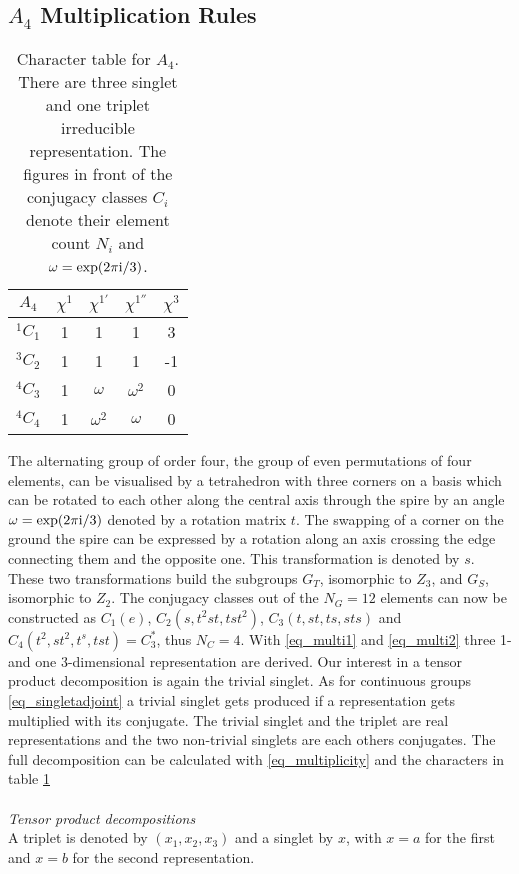 \begin{appendix}
\section{$A_4$ Multiplication Rules}
\label{sec_appendixA4}
\begin{table}[t]
 \begin{tabular}{c|cccc}
 $A_4$ & $\chi^1$ & $\chi^{1'}$ & $\chi^{1''}$ & $\chi^3$ \\
 \hline
 $^1C_1$ & 1 & 1 & 1 & 3\\
 $^3C_2$ & 1 & 1 & 1& -1\\
 $^4C_3$ & 1 & $\omega$& $\omega^2$ & 0\\
 $^4C_4$ & 1 & $\omega^2$& $\omega$ & 0
 \end{tabular}
\caption{Character table for $A_4$. There are three singlet and one triplet irreducible representation. The figures in front of the conjugacy
classes $C_i$ denote their element count $N_i$ and $\omega=\exp(2\pi\text{i}/3)$.}
\label{tab_charactertable}
\end{table}
The alternating group of order four, the group of even permutations of four elements, 
can be visualised by a tetrahedron with three corners on a basis which can be rotated to each other
along the central axis through the spire by an angle $\omega=\exp(2\pi\text{i}/3)$ denoted by a rotation matrix $t$. The swapping of a corner on the ground
the spire can be expressed by a rotation along an axis crossing the edge connecting them and the opposite one. This transformation is denoted by 
$s$. These two transformations build the subgroups $G_T$, isomorphic to $Z_3$, and $G_S$, isomorphic to $Z_2$\cite{0512103}. 
The conjugacy classes out of the $N_G=12$ elements can now be constructed as $C_1(e)$, $C_2(s,t^2st,tst^2)$, $C_3(t,st,ts,sts)$ and 
$C_4(t^2,st^2,t^s,tst)=C_3^*$, thus $N_C=4$. With \eqref{eq_multi1} and \eqref{eq_multi2} three 1- and one 3-dimensional representation are derived.
Our interest in a tensor product decomposition is again the trivial singlet. As for continuous groups \eqref{eq_singletadjoint} a trivial singlet 
gets produced if a representation gets multiplied with its conjugate. The trivial singlet and the triplet are real representations and the two
non-trivial singlets are each others conjugates. The full decomposition can be calculated with \eqref{eq_multiplicity} and the characters in table
\ref{tab_charactertable}
\\ \\ \textit{Tensor product decompositions}\\
A triplet is denoted by $(x_1,x_2,x_3)$ and a singlet by $x$, with $x=a$ for the first and $x=b$ for the second representation.

\end{appendix}

